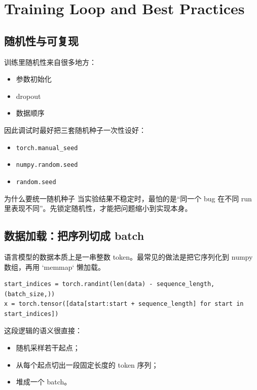 \documentclass[a4paper]{article}
\begin{document}
\section{Training Loop and Best Practices}

\subsection{随机性与可复现}

训练里随机性来自很多地方：
\begin{itemize}
    \item 参数初始化
    \item dropout
    \item 数据顺序
\end{itemize}

因此调试时最好把三套随机种子一次性设好：
\begin{itemize}
    \item \texttt{torch.manual\_seed}
    \item \texttt{numpy.random.seed}
    \item \texttt{random.seed}
\end{itemize}

\begin{importantbox}{为什么要统一随机种子}
当实验结果不稳定时，最怕的是“同一个 bug 在不同 run 里表现不同”。先锁定随机性，才能把问题缩小到实现本身。
\end{importantbox}

\subsection{数据加载：把序列切成 batch}

语言模型的数据本质上是一串整数 token。最常见的做法是把它序列化到 numpy 数组，再用 `memmap` 懒加载。

\begin{lstlisting}
start_indices = torch.randint(len(data) - sequence_length, (batch_size,))
x = torch.tensor([data[start:start + sequence_length] for start in start_indices])
\end{lstlisting}

这段逻辑的语义很直接：
\begin{itemize}
    \item 随机采样若干起点；
    \item 从每个起点切出一段固定长度的 token 序列；
    \item 堆成一个 batch。
\end{itemize}
\end{document}
